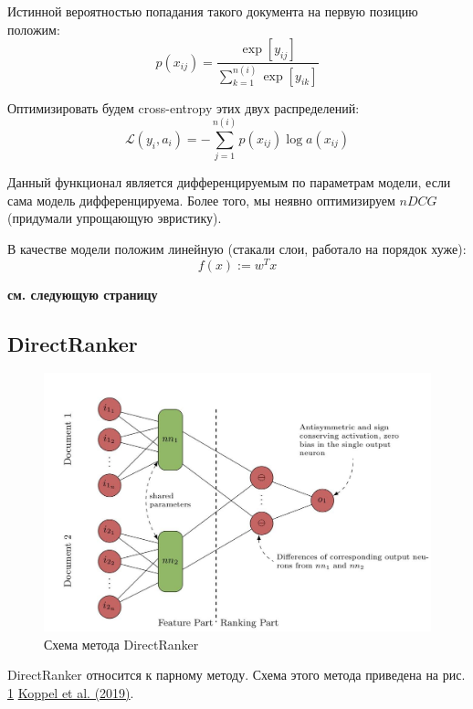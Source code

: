 \documentclass{article}[16pt]
\newcommand{\bibref}[3]{\hyperlink{#1}{#2 (#3)}}
\begin{document}
	Истинной вероятностью попадания такого документа на первую позицию положим:
	\begin{equation}
		p(x_{ij}) = \frac{\exp[y_{ij}]}{\sum_{k=1}^{n(i)}\exp[y_{ik}]}
	\end{equation}
	
	Оптимизировать будем cross-entropy этих двух распределений:
	\begin{equation}
		\mathcal{L}(y_i, a_i) = - \sum_{j=1}^{n(i)} p(x_{ij}) \log a(x_{ij})
	\end{equation}
	
	Данный функционал является дифференцируемым по параметрам модели, если сама модель дифференцируема. Более того, мы неявно оптимизируем $nDCG$ (придумали упрощающую эвристику).
	
	В качестве модели положим линейную (стакали слои, работало на порядок хуже):
	\begin{equation}
		f(x) := w^Tx
	\end{equation}

	\begin{flushright}
		\textbf{см. следующую страницу}
	\end{flushright}
	
	\subsection{DirectRanker}
	\begin{figure}[H]
		\centering
		\includegraphics[width=\textwidth]{DirectRanker.png}
	\caption{Схема метода DirectRanker} \label{fig:ranker}
	\end{figure}
	
	DirectRanker относится к парному методу. Схема этого метода приведена на рис. \ref{fig:ranker} \bibref{last}{Koppel et al.}{2019}.
\end{document}
